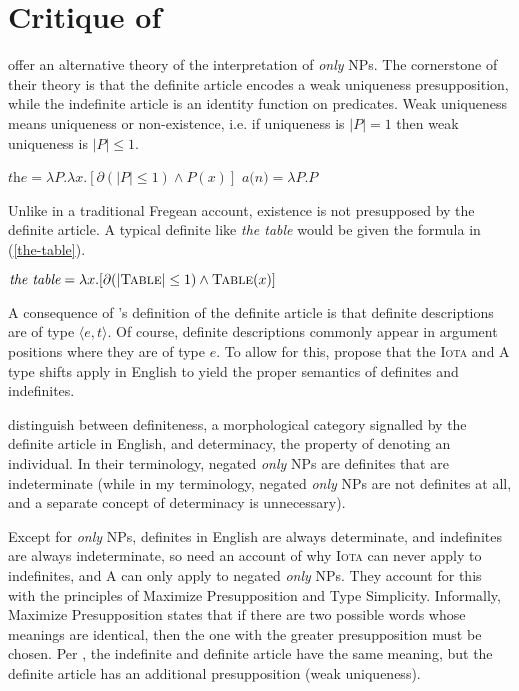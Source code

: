 \section{Critique of \citet{cb2015}\label{sec:coppock-beaver}}
\citet{cb2015} offer an alternative theory of the interpretation of \textit{only} NPs. The cornerstone of their theory is that the definite article encodes a weak uniqueness presupposition, while the indefinite article is an identity function on predicates. Weak uniqueness means uniqueness or non-existence, i.e. if uniqueness is $|P| = 1$ then weak uniqueness is $|P| \le 1$.

\begin{exe}
	\ex $\textit{the} = \lambda P . \lambda x . [\partial(|P| \le 1) \land P(x)]$
	\ex $\textit{a(n)} = \lambda P . P$
\end{exe}

Unlike in a traditional Fregean account, existence is not presupposed by the definite article. A typical definite like \textit{the table} would be given the formula in (\ref{the-table}).

\begin{exe}
	\ex \label{the-table} $\textit{the table} = \lambda x . [ \partial(|\textsc{Table}| \le 1) \land \textsc{Table}(x) ]$
\end{exe}

A consequence of \citeauthor{cb2015}'s definition of the definite article is that definite descriptions are of type $\langle e, t \rangle$. Of course, definite descriptions commonly appear in argument positions where they are of type $e$. To allow for this, \citeauthor{cb2015} propose that the \textsc{Iota} and \textsc{A} type shifts apply in English to yield the proper semantics of definites and indefinites.

\citeauthor{cb2015} distinguish between definiteness, a morphological category signalled by the definite article in English, and determinacy, the property of denoting an individual. In their terminology, negated \textit{only} NPs are definites that are indeterminate (while in my terminology, negated \textit{only} NPs are not definites at all, and a separate concept of determinacy is unnecessary).

Except for \textit{only} NPs, definites in English are always determinate, and indefinites are always indeterminate, so \citeauthor{cb2015} need an account of why \textsc{Iota} can never apply to indefinites, and \textsc{A} can only apply to negated \textit{only} NPs. They account for this with the principles of Maximize Presupposition and Type Simplicity. Informally, Maximize Presupposition states that if there are two possible words whose meanings are identical, then the one with the greater presupposition must be chosen. Per \citeauthor{cb2015}, the indefinite and definite article have the same meaning, but the definite article has an additional presupposition (weak uniqueness).

